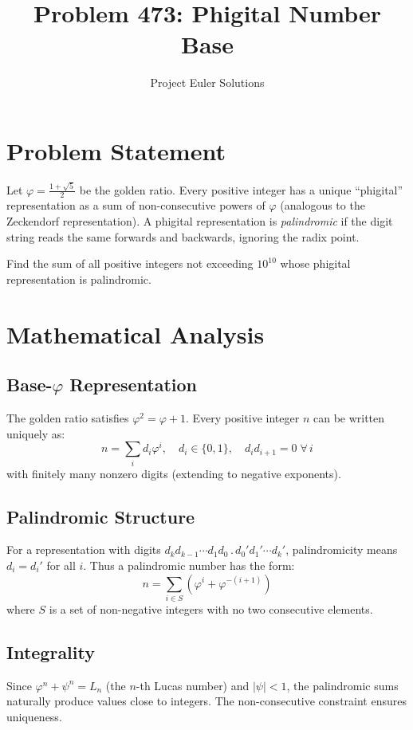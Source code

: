 \documentclass[11pt]{article}
\title{Problem 473: Phigital Number Base}
\author{Project Euler Solutions}
\date{}
\begin{document}
\maketitle

\section{Problem Statement}
Let $\varphi = \frac{1+\sqrt{5}}{2}$ be the golden ratio. Every positive integer has a unique ``phigital'' representation as a sum of non-consecutive powers of $\varphi$ (analogous to the Zeckendorf representation). A phigital representation is \emph{palindromic} if the digit string reads the same forwards and backwards, ignoring the radix point.

Find the sum of all positive integers not exceeding $10^{10}$ whose phigital representation is palindromic.

\section{Mathematical Analysis}
\subsection{Base-$\varphi$ Representation}
The golden ratio satisfies $\varphi^2 = \varphi + 1$. Every positive integer $n$ can be written uniquely as:
\[
n = \sum_{i} d_i \varphi^i, \quad d_i \in \{0,1\}, \quad d_i d_{i+1} = 0 \;\forall\, i
\]
with finitely many nonzero digits (extending to negative exponents).

\subsection{Palindromic Structure}
For a representation with digits $d_k d_{k-1} \cdots d_1 d_0 \,.\, d_0' d_1' \cdots d_k'$, palindromicity means $d_i = d_i'$ for all $i$. Thus a palindromic number has the form:
\[
n = \sum_{i \in S} \left(\varphi^i + \varphi^{-(i+1)}\right)
\]
where $S$ is a set of non-negative integers with no two consecutive elements.

\subsection{Integrality}
Since $\varphi^n + \psi^n = L_n$ (the $n$-th Lucas number) and $|\psi| < 1$, the palindromic sums naturally produce values close to integers. The non-consecutive constraint ensures uniqueness.
\end{document}
